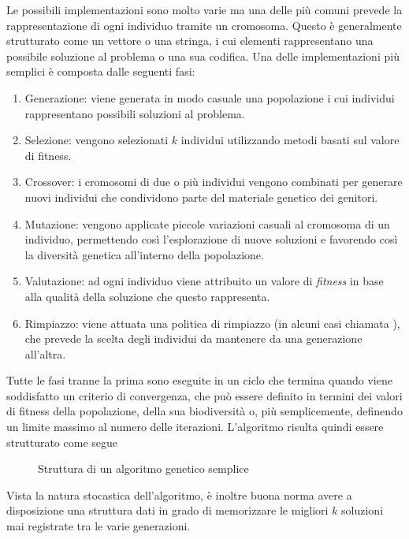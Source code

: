 Le possibili implementazioni sono molto varie ma una delle più comuni prevede
la rappresentazione di ogni individuo tramite un cromosoma. Questo è
generalmente strutturato come un vettore o una stringa, i cui elementi
rappresentano una possibile soluzione al problema o una sua codifica. Una delle
implementazioni più semplici è composta dalle seguenti fasi:
\begin{enumerate}
    \item Generazione: viene generata in modo casuale una popolazione i cui
          individui rappresentano possibili soluzioni al problema.
    \item Selezione: vengono selezionati $k$ individui utilizzando metodi
          basati sul valore di fitness.
    \item Crossover: i cromosomi di due o più individui vengono combinati per
          generare nuovi individui che condividono parte del materiale genetico
          dei genitori.
    \item Mutazione: vengono applicate piccole variazioni casuali al cromosoma
          di un individuo, permettendo così l'esplorazione di nuove soluzioni e
          favorendo così la diversità genetica all'interno della popolazione.
    \item Valutazione: ad ogni individuo viene attribuito un valore di
          \textit{fitness} in base alla qualità della soluzione che questo
          rappresenta.
    \item Rimpiazzo: viene attuata una politica di rimpiazzo (in alcuni casi
          chiamata ), che prevede la scelta degli
          individui da mantenere da una generazione all'altra.
\end{enumerate}
Tutte le fasi tranne la prima sono eseguite in un ciclo che termina quando
viene soddisfatto un criterio di convergenza, che può essere definito in
termini dei valori di fitness della popolazione, della sua biodiversità o, più
semplicemente, definendo un limite massimo al numero delle iterazioni.
L'algoritmo risulta quindi essere strutturato come segue
\begin{figure}
    \centering
    
    \caption{Struttura di un algoritmo genetico semplice}
    \label{fig:simple_ga}
\end{figure}
Vista la natura stocastica dell'algoritmo, è inoltre buona norma avere a
disposizione una struttura dati in grado di memorizzare le migliori $k$
soluzioni mai registrate tra le varie generazioni.

